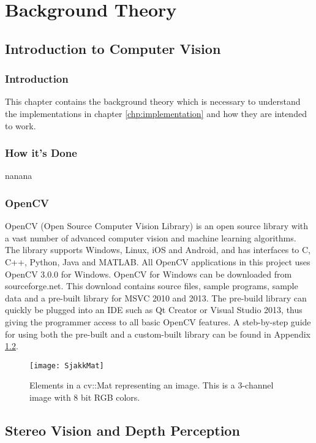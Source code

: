 \chapter{Background Theory}

\section{Introduction to Computer Vision}

\subsection{Introduction}
This chapter contains the background theory which is necessary to understand the implementations in chapter \ref{chp:implementation} and how they are intended to work. 

\subsection{How it's Done}
nanana

\subsection{OpenCV}

OpenCV (Open Source Computer Vision Library) is an  open source library with a vast number of advanced computer vision and machine learning algorithms. The library supports Windows, Linux, iOS and Android, and has interfaces to C, C++, Python, Java and MATLAB. All OpenCV applications in this project uses OpenCV 3.0.0 for Windows. OpenCV for Windows can be downloaded from sourceforge.net. This download contains source files, sample programs, sample data and a pre-built library for MSVC 2010 and 2013. The pre-build library can quickly be plugged into  an IDE such as Qt Creator or Visual Studio 2013, thus giving the programmer access to all basic OpenCV features. A steb-by-step guide for using both the pre-built and a custom-built library can be found in Appendix \ref{}.

\begin{figure}
\centering
\texttt{[image: SjakkMat]}
\caption{Elements in a cv::Mat representing an image. This is a 3-channel image with 8 bit RGB colors.}
\label{fig:matGrid}
\end{figure}

\section{Stereo Vision and Depth Perception}

